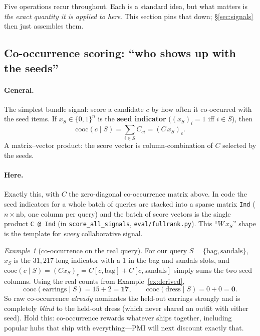 \documentclass[11pt]{article}
\theoremstyle{remark}
\newtheorem{example}{Example}
\newcommand{\xs}{x_S}
\newcommand{\code}[1]{\texttt{\small #1}}
\begin{document}
Five operations recur throughout. Each is a standard idea, but what matters is \emph{the exact quantity it is
applied to here}. This section pins that down; \S\ref{sec:signals} then just assembles them.

\subsection{Co-occurrence scoring: ``who shows up with the seeds''}

\paragraph{General.} The simplest bundle signal: score a candidate $c$ by how often it co-occurred with the seed
items. If $\xs\in\{0,1\}^n$ is the \textbf{seed indicator} ($(\xs)_i=1$ iff $i\in S$), then
\[
  \text{cooc}(c\mid S)=\sum_{i\in S}C_{ci}=(C\,\xs)_c .
\]
A matrix--vector product: the score vector is column-combination of $C$ selected by the seeds.

\paragraph{Here.} Exactly this, with $C$ the zero-diagonal co-occurrence matrix above. In code the seed indicators
for a whole batch of queries are stacked into a sparse matrix \code{Ind} ($n\times\text{nb}$, one column per query)
and the batch of score vectors is the single product \code{C @ Ind} (in \code{score\_all\_signals}, \code{eval/fullrank.py}). This
``$W\,\xs$'' shape is the template for \emph{every} collaborative signal.

\begin{example}[co-occurrence on the real query]\label{ex:cooc}
For our query $S=\{\text{bag},\text{sandals}\}$, $\xs$ is the $31{,}217$-long indicator with a $1$ in the bag and
sandals slots, and $\mathrm{cooc}(c\mid S)=(C\xs)_c=C[c,\text{bag}]+C[c,\text{sandals}]$ simply sums the two seed
columns. Using the real counts from Example~\ref{ex:derived},
\[
  \mathrm{cooc}(\text{earrings}\mid S)=15+2=\mathbf{17},\qquad
  \mathrm{cooc}(\text{dress}\mid S)=0+0=\mathbf{0}.
\]
So raw co-occurrence \emph{already} nominates the held-out earrings strongly and is completely \emph{blind} to the
held-out dress (which never shared an outfit with either seed). Hold this: co-occurrence rewards whatever ships
together, including popular hubs that ship with everything---PMI will next discount exactly that.
\end{example}
\end{document}
